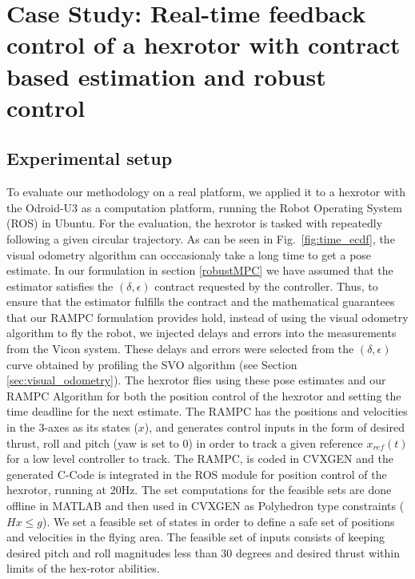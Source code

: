 \section{Case Study: Real-time feedback control of a hexrotor with contract based estimation and robust control}
\label{sec:experiments}

\subsection{Experimental setup}
To evaluate our methodology on a real platform, we applied it to a hexrotor with the Odroid-U3 as a computation platform, running the Robot Operating System (ROS) \cite{ROS288} in Ubuntu. For the evaluation, the hexrotor is tasked with repeatedly following a given circular trajectory.
As can be seen in Fig.~\ref{fig:time_ecdf}, the visual odometry algorithm can occcasionaly take a long time to get a pose estimate. In our formulation in section \ref{robustMPC} we have assumed that the estimator satisfies the $(\delta, \epsilon)$ contract requested by the controller. Thus, to ensure that the estimator fulfills the contract and the mathematical guarantees that our RAMPC formulation provides hold, instead of using the visual odometry algorithm to fly the robot, we injected delays and errors into the measurements from the Vicon system. These delays and errors were selected from the $(\delta,\epsilon)$ curve obtained by profiling the SVO algorithm (see Section \ref{sec:visual_odometry}).
The hexrotor flies using these pose estimates and our RAMPC Algorithm for both the position control of the hexrotor and setting the time deadline for the next estimate. The RAMPC has the positions and velocities in the 3-axes as its states ($x$), and generates control inputs in the form of desired thrust, roll and pitch (yaw is set to 0) in order to track a given reference $x_{ref}(t)$ for a low level controller to track. The RAMPC, is coded in CVXGEN \cite{cvxgen} and the generated C-Code is integrated in the ROS module for position control of the hexrotor, running at 20Hz. The set computations for the feasible sets are done offline in MATLAB and then used in CVXGEN as Polyhedron type constraints ($Hx \le g$). We set a feasible set of states in order to define a safe set of positions and velocities in the flying area. The feasible set of inputs consists of keeping desired pitch and roll magnitudes less than $30$ degrees and desired thrust within limits of the hex-rotor abilities.
